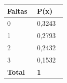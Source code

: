 \begin{tabular}{C{0.45\linewidth} C{0.45\linewidth}}
\toprule
\textbf{Faltas} & \textbf{P(x)} \\
 & 0{,}3243 \\
1 & 0{,}2793 \\
2 & 0{,}2432 \\
3 & 0{,}1532 \\
\midrule
\textbf{Total} & \textbf{1} \\
\bottomrule
\end{tabular}

